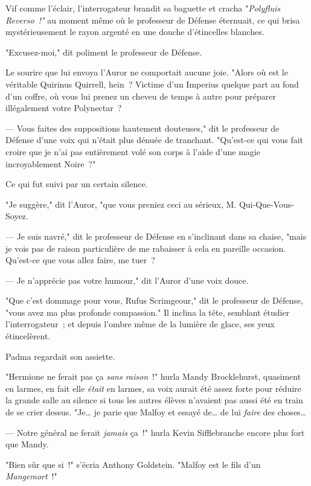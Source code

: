 Vif comme l'éclair, l'interrogateur brandit sa baguette et cracha "\emph{Polyfluis Reverso~!"} au moment même où le professeur de Défense éternuait, ce qui brisa mystérieusement le rayon argenté en une douche d'étincelles blanches.

"Excusez-moi," dit poliment le professeur de Défense.

Le sourire que lui envoya l'Auror ne comportait aucune joie. "Alors où est le véritable Quirinus Quirrell, hein~? Victime d'un Imperius quelque part au fond d'un coffre, où vous lui prenez un cheveu de temps à autre pour préparer illégalement votre Polynectar~?

--- Vous faites des suppositions hautement douteuses," dit le professeur de Défense d'une voix qui n'était plus dénuée de tranchant. "Qu'est-ce qui vous fait croire que je n'ai pas entièrement volé son corps à l'aide d'une magie incroyablement Noire~?"

Ce qui fut suivi par un certain silence.

"Je suggère," dit l'Auror, "que vous preniez ceci au sérieux, M. Qui-Que-Vous-Soyez.

--- Je suis navré," dit le professeur de Défense en s'inclinant dans sa chaise, "mais je vois pas de raison particulière de me rabaisser à cela en pareille occasion. Qu'est-ce que vous allez faire, me tuer~?

--- Je n'apprécie pas votre humour," dit l'Auror d'une voix douce.

"Que c'est dommage pour vous, Rufus Scrimgeour," dit le professeur de Défense, "vous avez ma plus profonde compassion." Il inclina la tête, semblant étudier l'interrogateur~; et depuis l'ombre même de la lumière de glace, ses yeux étincelèrent.

\later

Padma regardait son assiette.

"Hermione ne ferait pas ça \emph{sans raison}~!" hurla Mandy Brocklehurst, quasiment en larmes, en fait elle \emph{était} en larmes, sa voix aurait été assez forte pour réduire la grande salle au silence si tous les autres élèves n'avaient pas aussi été en train de se crier dessus. "Je… je parie que Malfoy et essayé de… de lui \emph{faire} des choses…

--- Notre général ne ferait \emph{jamais} ça~!" hurla Kevin Sifflebranche encore plus fort que Mandy.

"Bien sûr que si~!" s'écria Anthony Goldstein. "Malfoy est le fils d'un \emph{Mangemort}~!"

